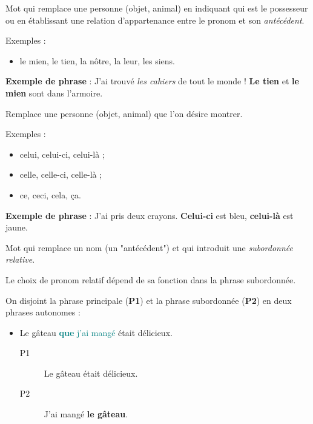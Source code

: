 \documentclass[10pt, french]{article}
\begin{document}
\begin{multicols*}{2}
\begin{definitionNOHFILLsub}
Mot qui remplace une personne (objet, animal) en indiquant qui est le possesseur ou en établissant une relation d'appartenance entre le pronom et son \textit{antécédent}.

\tcbline

Exemples :
\begin{itemize}
	\item	le mien, le tien, la nôtre, la leur, les siens.
\end{itemize}

\textbf{Exemple de phrase} : J'ai trouvé \textit{les cahiers} de tout le monde ! \textbf{Le tien} et \textbf{le mien} sont dans l'armoire.
\end{definitionNOHFILLsub}

\begin{definitionNOHFILLsub}
Remplace une personne (objet, animal) que l'on désire montrer.

\tcbline

Exemples :
\begin{itemize}
	\item	celui, celui-ci, celui-là ;
	\item	celle, celle-ci, celle-là ;
	\item	ce, ceci, cela, ça.
\end{itemize}

\textbf{Exemple de phrase} : J'ai pris deux crayons. \textbf{Celui-ci} est bleu, \textbf{celui-là} est jaune.
\end{definitionNOHFILLsub}

\begin{definitionNOHFILLsub}
Mot qui remplace un nom (un "antécédent") et qui introduit une \textit{subordonnée relative}.

\tcbline

Le choix de pronom relatif dépend de sa fonction dans la phrase subordonnée.
\begin{astuces}
On disjoint la phrase principale (\textbf{P1}) et la phrase subordonnée (\textbf{P2}) en deux phrases autonomes :
\begin{itemize}
	\item	Le gâteau \textcolor{teal}{\textbf{que} j'ai mangé} était délicieux.
		\begin{description}
		\item[P1]	Le gâteau était délicieux.
		\item[P2]	J'ai mangé \textbf{le gâteau}.
		\end{description}
\end{itemize}


\end{astuces}
\end{definitionNOHFILLsub}
\end{multicols*}
\end{document}
